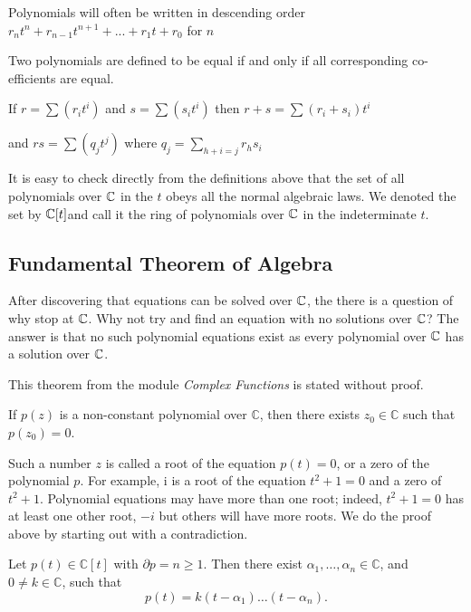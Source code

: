 Polynomials will often be written in descending order $r_n t^n + r_{n-1} t^{n+1} + ... + r_1 t + r_0$ for $n$

Two polynomials are defined to be equal if and only if all corresponding co-efficients are equal.

If $r = \sum (r_i t^i)$ and $s = \sum (s_i t^i)$ then $r+s = \sum (r_i + s_i)t^i$

and $rs = \sum (q_j t^j)$ where $q_j = \sum_{h+i=j} r_h s_i$

It is easy to check directly from the definitions above that the set of all polynomials over $\mathbb C$ in the $t$ obeys all the normal algebraic laws. We denoted the set by $\mathbb C[t]$and call it the ring of polynomials over $\mathbb C$ in the indeterminate $t$.

\subsection{Fundamental Theorem of Algebra} 

After discovering that equations can be solved over $\mathbb C$, the there is a question of why stop at $\mathbb C$. Why not try and find an equation with no solutions over $\mathbb C$? The answer is that no such polynomial equations exist as every polynomial over $\mathbb C$ has a solution over $\mathbb C$.

This theorem from the module \textit{Complex Functions} is stated without proof. 

\begin{theorem} \label{thm:fundamental-algebra}
    If $p(z)$ is a non-constant polynomial over $\mathbb{C}$, then there exists $z_0 \in \mathbb{C}$ such that $p\left(z_0\right)=0$.
\end{theorem}

Such a number $z$ is called a root of the equation $p(t)=0$, or a zero of the polynomial $p$. For example, $\mathrm{i}$ is a root of the equation $t^2+1=0$ and a zero of $t^2+1$. Polynomial equations may have more than one root; indeed, $t^2+1=0$ has at least one other root, $-i$ but others will have more roots. We do the proof above by starting out with a contradiction.

\begin{proposition}
    Let $p(t) \in \mathbb{C}[t]$ with $\partial p=n \geq 1$. Then there exist $\alpha_1, \ldots, \alpha_n \in \mathbb{C}$, and $0 \neq k \in \mathbb{C}$, such that
    $$
    p(t)=k\left(t-\alpha_1\right) \ldots\left(t-\alpha_n\right).
    $$
\end{proposition}


